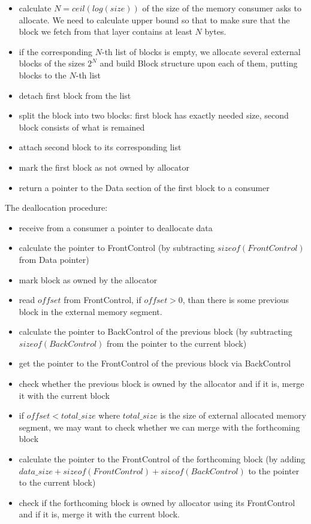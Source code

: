 \documentclass{article}
\begin{document}
\begin{itemize}
\item calculate $N = ceil(log(size))$ of the size of the memory consumer asks to allocate. We need to calculate upper bound so that to make sure that the block we fetch from that layer contains at least $N$ bytes.
\item if the corresponding $N$-th list of blocks is empty, we allocate several external blocks of the sizes $2^{N}$ and build Block structure upon each of them, putting blocks to the $N$-th list
\item detach first block from the list
\item split the block into two blocks: first block has exactly needed size, second block consists of what is remained
\item attach second block to its corresponding list
\item mark the first block as not owned by allocator
\item return a pointer to the Data section of the first block to a consumer
\end{itemize}

The deallocation procedure:
\begin{itemize}
\item receive from a consumer a pointer to deallocate data
\item calculate the pointer to FrontControl (by subtracting $sizeof(FrontControl)$ from Data pointer)
\item mark block as owned by the allocator
\item read $offset$ from FrontControl, if $offset > 0$, than there is some previous block in the external memory segment.
\item calculate the pointer to BackControl of the previous block (by subtracting $sizeof(BackControl)$ from the pointer to the current block)
\item get the pointer to the FrontControl of the previous block via BackControl
\item check whether the previous block is owned by the allocator and if it is, merge it with the current block
\item if $offset < total\_size$ where $total\_size$ is the size of external allocated memory segment, we may want to check whether we can merge with the forthcoming block
\item calculate the pointer to the FrontControl of the forthcoming block (by adding $data\_size + sizeof(FrontControl) + sizeof(BackControl)$ to the pointer to the current block)
\item check if the forthcoming block is owned by allocator using its FrontControl and if it is, merge it with the current block.
\end{itemize}
\newpage
\end{document}
